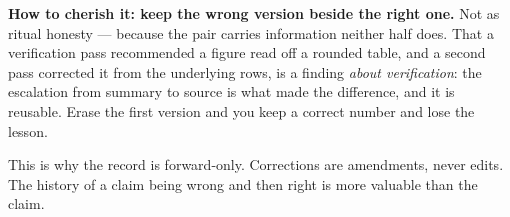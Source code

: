 \textbf{How to cherish it: keep the wrong version beside the right one.} Not as ritual honesty --- because the pair carries information neither half does. That a verification pass recommended a figure read off a rounded table, and a second pass corrected it from the underlying rows, is a finding \textit{about verification}: the escalation from summary to source is what made the difference, and it is reusable. Erase the first version and you keep a correct number and lose the lesson.

This is why the record is forward-only. Corrections are amendments, never edits. The history of a claim being wrong and then right is more valuable than the claim.
